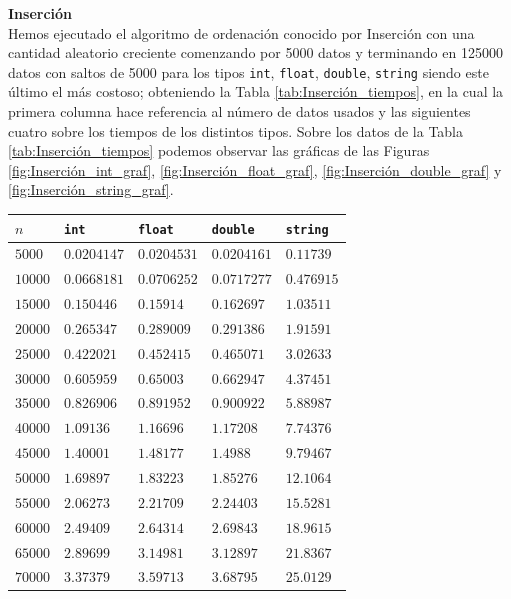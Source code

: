 \documentclass[12pt]{article}
\begin{document}
    \textbf{Inserción}\\
    Hemos ejecutado el algoritmo de ordenación conocido por Inserción con una cantidad aleatorio creciente comenzando por 5000 datos y terminando en 125000 datos con saltos de 5000 para los tipos \verb|int|, \verb|float|, \verb|double|, \verb|string| siendo este último el más costoso; obteniendo la Tabla \ref{tab:Inserción_tiempos}, en la cual la primera columna hace referencia al número de datos usados y las siguientes cuatro sobre los tiempos de los distintos tipos. Sobre los datos de la Tabla \ref{tab:Inserción_tiempos} podemos observar las gráficas de las Figuras \ref{fig:Inserción_int_graf}, \ref{fig:Inserción_float_graf}, \ref{fig:Inserción_double_graf} y \ref{fig:Inserción_string_graf}.
    \begin{table}
        \centering
        \begin{tabular}{|l|l|l|l|l|}
            \hline
            $n$ & \verb|int| & \verb|float| & \verb|double| & \verb|string| \\
            \hline
            $5000$ & $0.0204147$ & $0.0204531$ & $0.0204161$ & $0.11739$ \\
            $10000$ & $0.0668181$ & $0.0706252$ & $0.0717277$ & $0.476915$ \\
            $15000$ & $0.150446$ & $0.15914$ & $0.162697$ & $1.03511$ \\
            $20000$ & $0.265347$ & $0.289009$ & $0.291386$ & $1.91591$ \\
            $25000$ & $0.422021$ & $0.452415$ & $0.465071$ & $3.02633$ \\
            $30000$ & $0.605959$ & $0.65003$ & $0.662947$ & $4.37451$ \\
            $35000$ & $0.826906$ & $0.891952$ & $0.900922$ & $5.88987$ \\
            $40000$ & $1.09136$ & $1.16696$ & $1.17208$ & $7.74376$ \\
            $45000$ & $1.40001$ & $1.48177$ & $1.4988$ & $9.79467$ \\
            $50000$ & $1.69897$ & $1.83223$ & $1.85276$ & $12.1064$ \\
            $55000$ & $2.06273$ & $2.21709$ & $2.24403$ & $15.5281$ \\
            $60000$ & $2.49409$ & $2.64314$ & $2.69843$ & $18.9615$ \\
            $65000$ & $2.89699$ & $3.14981$ & $3.12897$ & $21.8367$ \\
            $70000$ & $3.37379$ & $3.59713$ & $3.68795$ & $25.0129$ \\

\end{tabular}
\end{table}
\end{document}
